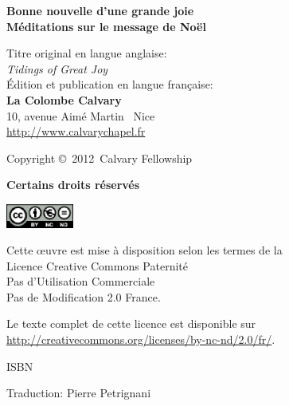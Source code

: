 \newpage
\mbox{}
\vfill

{\scriptsize

{\bfseries Bonne nouvelle d'une grande joie\\
 Méditations sur le message de No\"el}

Titre original en langue anglaise:\\
\emph{Tidings of Great Joy} \\

Édition et publication en langue fran\c{c}aise:\\
 {\bfseries La Colombe Calvary}\\
 10, avenue Aimé Martin ~Nice\\
 \url{http://www.calvarychapel.fr}

Copyright \copyright{}~2012~Calvary Fellowship

{\bfseries Certains droits réservés}

\includegraphics[width=6em]{by-nc-nd_eu}

Cette \oe{}uvre est mise à disposition selon les termes de la \\
 Licence Creative Commons Paternité \\
 \ocadr Pas d'Utilisation Commerciale \\
 \ocadr Pas de Modification 2.0 France.

Le texte complet de cette licence est disponible sur \\
 \url{http://creativecommons.org/licenses/by-nc-nd/2.0/fr/}.

ISBN~\isbn

Traduction: Pierre Petrignani


}
\pagebreak

